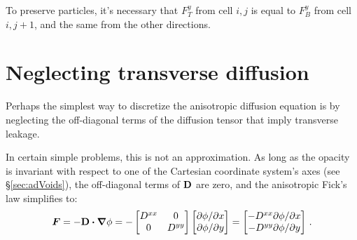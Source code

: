 To preserve particles, it's necessary that $F_T^y$ from cell $i,j$ is equal to
$F_B^y$ from cell $i,{j+1}$, and the same from the other directions.

\section{Neglecting transverse diffusion}\label{sec:discreteDiag}

Perhaps the simplest way to discretize the anisotropic diffusion equation is by
neglecting the off-diagonal terms of the diffusion tensor that imply transverse
leakage.

In certain simple problems, this is not an approximation. As long as the
opacity is invariant with respect to one of the Cartesian coordinate system's
axes (see \S\ref{sec:adVoids}), the off-diagonal terms of $\mathbf{D}$ are
zero, and the anisotropic Fick's law simplifies to:
\begin{equation*}
  \bm{F} = - \mathbf{D} \bm{\cdot} \bm{\nabla} \phi
  = -
  \begin{bmatrix}
    D^{xx} & 0 \\
    0 & D^{yy}
  \end{bmatrix}
  \begin{bmatrix}
    {\partial \phi}/{\partial x} \\
    {\partial \phi}/{\partial y}
  \end{bmatrix}
  = 
  \begin{bmatrix}
    - D^{xx} {\partial \phi}/{\partial x} \\
    - D^{yy} {\partial \phi}/{\partial y}
  \end{bmatrix}
  \,.
\end{equation*}

